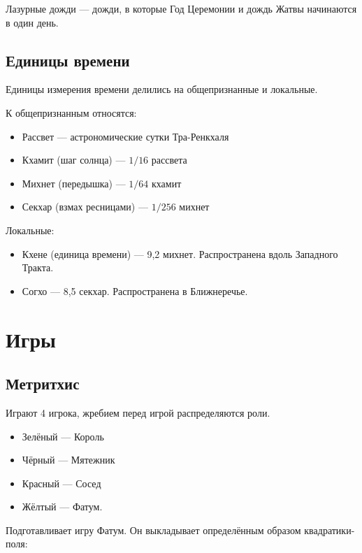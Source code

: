 \documentclass[a4paper,12pt,fleqn]{book}\usepackage{cooltooltips}\usepackage{polyglossia}\setdefaultlanguage[babelshorthands=true]{russian}\setotherlanguage{english}\defaultfontfeatures{Ligatures=TeX,Mapping=tex-text} \usepackage{xcolor}\definecolor{lightgray}{HTML}{bbbbbb}\color{lightgray}\newcommand{\ml}[3]{\textenglish{\textcolor{black}{#3}}}
\begin{document}
{Лазурные дожди --- дожди, в которые Год Церемонии и дождь Жатвы начинаются в один день.


\subsection{Единицы времени}

Единицы измерения времени делились на общепризнанные и локальные.

К общепризнанным относятся:

\begin{itemize}
\item Рассвет --- астрономические сутки Тра-Ренкхаля
\item Кхамит (шаг солнца) --- $1/16$ рассвета
\item Михнет (передышка) --- $1/64$ кхамит
\item Секхар (взмах ресницами) --- $1/256$ михнет
\end{itemize}

Локальные:

\begin{itemize}
\item Кхене (единица времени) --- 9,2 михнет. Распространена вдоль Западного Тракта.
\item Согхо --- 8,5 секхар. Распространена в Ближнеречье.
\end{itemize}

\section{Игры}

\subsection{Метритхис}

Играют 4 игрока, жребием перед игрой распределяются роли.

\begin{itemize}
\item Зелёный --- Король
\item Чёрный --- Мятежник
\item Красный --- Сосед
\item Жёлтый --- Фатум.
\end{itemize}

Подготавливает игру Фатум.
Он выкладывает определённым образом квадратики-поля:

}
\end{document}
